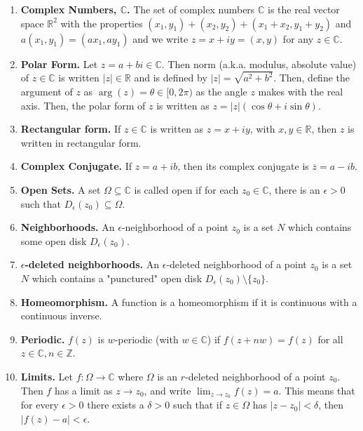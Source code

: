 \documentclass[12pt]{article}
\theoremstyle{definition}
\theoremstyle{named}
\begin{document}
{\tiny 
\begin{multicols}{2}
\begin{spacing}{1.01}

\begin{enumerate}
    \item \textbf{Complex Numbers, $\mathbb{C}$. } The set of complex numbers $\mathbb{C}$ is the real vector space $\mathbb{R}^2$ with the properties $(x_1,y_1) + (x_2,y_2) + (x_1+x_2,y_1+y_2)$ and $a(x_1,y_1) = (ax_1,ay_1)$ and we write $z = x+iy = (x,y)$ for any $z \in \mathbb{C}$. 
    \item \textbf{Polar Form. } Let $z = a+bi \in \mathbb{C}$. Then norm (a.k.a. modulus, absolute value) of $z \in \mathbb{C}$ is written $|z| \in \mathbb{R}$ and is defined by $|z| = \sqrt{a^2 + b^2}$. Then, define the argument of $z$ as $\arg(z) = \theta \in [0,2\pi)$ as the angle $z$ makes with the real axis. Then, the polar form of $z$ is written as $z = |z| \left(\cos\theta + i\sin\theta\right)$. 
    \item \textbf{Rectangular form. } If $z \in \mathbb{C}$ is written as $z = x+iy$, with $x,y \in \mathbb{R}$, then $z$ is written in rectangular form. 
    \item \textbf{Complex Conjugate. } If $z = a+ib$, then its complex conjugate is $\overline{z} = a-ib$. 
    \item \textbf{Open Sets. } A set $\Omega \subseteq \mathbb{C}$ is called open if for each $z_0 \in \mathbb{C}$, there is an $\epsilon > 0$ such that $D_{\epsilon}(z_0) \subseteq \Omega$. 
    \item \textbf{Neighborhoods. } An $\epsilon$-neighborhood of a point $z_0$ is a set $N$ which contains some open disk $D_{\epsilon}(z_0)$. 
    \item \textbf{$\epsilon$-deleted neighborhoods. } An $\epsilon$-deleted neighborhood of a point $z_0$ is a set $N$ which contains a "punctured" open disk $D_{\epsilon}(z_0) \setminus \{z_0\}$.
    \item \textbf{Homeomorphism. } A function is a homeomorphism if it is continuous with a continuous inverse. 
    \item \textbf{Periodic. } $f(z)$ is $w$-periodic (with $w \in \mathbb{C}$) if $f(z + nw) = f(z)$ for all $z \in \mathbb{C}, n \in \mathbb{Z}$. 
    \item \textbf{Limits. } Let $f: \Omega \to \mathbb{C}$ where $\Omega$ is an $r$-deleted neighborhood of a point $z_0$. Then $f$ has a limit as $z \to z_0$, and write $\lim_{z \to z_0} f(z) = a$. This means that for every $\epsilon > 0$ there exists a $\delta > 0$ such that if $z \in \Omega$ has $|z-z_0| < \delta$, then $|f(z) - a| < \epsilon$. 

\end{enumerate}
\end{spacing}
\end{multicols}}
\end{document}
